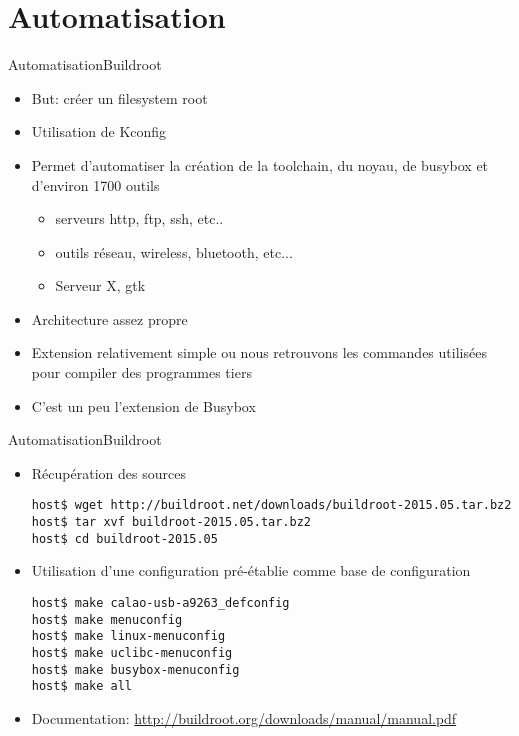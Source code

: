 \section{Automatisation}

\begin{frame}[fragile=singleslide]{Automatisation}{Buildroot}
  \begin{itemize}
  \item But: créer un filesystem root
  \item Utilisation de Kconfig
  \item Permet d'automatiser la création  de la toolchain, du noyau,
    de busybox et d'environ 1700 outils
    \begin{itemize}
    \item serveurs http, ftp, ssh, etc..
    \item outils réseau, wireless, bluetooth, etc...
    \item Serveur X, gtk
    \end{itemize}
  \item Architecture assez propre
  \item Extension relativement simple ou nous retrouvons les commandes
    utilisées pour compiler des programmes tiers
  \item C'est un peu l'extension de Busybox
  \end{itemize}
\end{frame}

\begin{frame}[fragile=singleslide]{Automatisation}{Buildroot}
  \begin{itemize}
  \item Récupération des sources
    \begin{lstlisting}
host$ wget http://buildroot.net/downloads/buildroot-2015.05.tar.bz2
host$ tar xvf buildroot-2015.05.tar.bz2
host$ cd buildroot-2015.05
    \end{lstlisting}
  \item  Utilisation  d'une configuration  pré-établie  comme base  de
    configuration
    \begin{lstlisting}
host$ make calao-usb-a9263_defconfig
host$ make menuconfig
host$ make linux-menuconfig
host$ make uclibc-menuconfig
host$ make busybox-menuconfig
host$ make all
    \end{lstlisting}
  \item Documentation: \url{http://buildroot.org/downloads/manual/manual.pdf}
  \end{itemize}
\end{frame}

